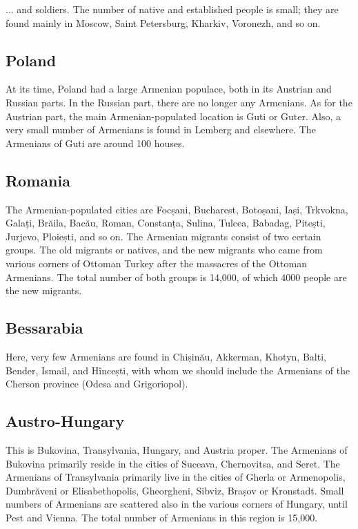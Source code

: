 ... and soldiers. The number of native and established people is small; they are found mainly in Moscow, Saint Petersburg, Kharkiv, Voronezh, and so on. 

\subsection{Poland}

At its time, Poland had a large Armenian populace, both in its Austrian and Russian parts. In the Russian part, there are no longer any Armenians. As for the Austrian part, the main Armenian-populated location is Guti or Guter. Also, a very small number of Armenians is found in Lemberg and elsewhere. The Armenians of Guti are around 100 houses.

\subsection{Romania}

The Armenian-populated cities are Focșani, Bucharest, Botoșani, Iași, Trkvokna, Galați, Brăila, Bacău, Roman, Constanța, Sulina, Tulcea, Babadag, Pitești, Jurjevo, Ploiești, and so on. The Armenian migrants consist of two certain groups. The old migrants or natives, and the new migrants who came from various corners of Ottoman Turkey after the massacres of the Ottoman Armenians. The total number of both groups is 14,000, of which 4000 people are the new migrants. 

\subsection{Bessarabia}

Here, very few Armenians are found in Chișinău, Akkerman, Khotyn, Balti, Bender, Ismail, and Hîncești, with whom we should include the Armenians of the Cherson province (Odesa and Grigoriopol).

\subsection{Austro-Hungary}

This is Bukovina, Transylvania, Hungary, and Austria proper. The Armenians of Bukovina primarily reside in the cities of Suceava, Chernovitsa, and Seret. The Armenians of Transylvania primarily live in the cities of Gherla or Armenopolis, Dumbrăveni  or Elisabethopolis, Gheorgheni, Sibviz, Brașov or Kronstadt. Small numbers of Armenians are scattered also in the various corners of Hungary, until Pest and Vienna. The total number of Armenians in this region is 15,000. 

